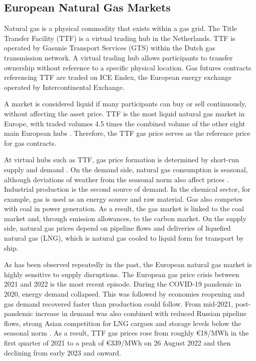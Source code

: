 \subsection{European Natural Gas Markets}\label{sec:gas-markets}
Natural gas is a physical commodity that exists within a gas grid. The Title Transfer Facility (TTF) is a virtual trading hub in the Netherlands. TTF is operated by Gasunie Transport Services (GTS) within the Dutch gas transmission network. A virtual trading hub allows participants to transfer ownership without reference to a specific physical location. Gas futures contracts referencing TTF are traded on ICE Endex, the European energy exchange operated by Intercontinental Exchange.

A market is considered liquid if many participants can buy or sell continuously, without affecting the asset price. TTF is the most liquid natural gas market in Europe, with traded volumes 4.5 times the combined volume of the other eight main European hubs \parencite{heatherEuropeanTradedGas2026}. Therefore, the TTF gas price serves as the reference price for gas contracts. 

At virtual hubs such as TTF, gas price formation is determined by short-run supply and demand \parencite{obadiDRIVINGFUNDAMENTALSNATURAL2020}. On the demand side, natural gas consumption is seasonal, although deviations of weather from the seasonal norm also affect prices \parencite{brownWhatDrivesNatural2008}. Industrial production is the second source of demand. In the chemical sector, for example, gas is used as an energy source and raw material. Gas also competes with coal in power generation. As a result, the gas market is linked to the coal market and, through emission allowances, to the carbon market. On the supply side, natural gas prices depend on pipeline flows and deliveries of liquefied natural gas (LNG), which is natural gas cooled to liquid form for transport by ship. 

As has been observed repeatedly in the past, the European natural gas market is highly sensitive to supply disruptions. The European gas price crisis between 2021 and 2022 is the most recent episode. During the COVID-19 pandemic in 2020, energy demand collapsed. This was followed by economies reopening and gas demand recovered faster than production could follow. From mid-2021, post-pandemic increase in demand was also combined with reduced Russian pipeline flows, strong Asian competition for LNG cargoes and storage levels below the seasonal norm \parencite{heather2022unfortunate}. As a result, TTF gas prices rose from roughly €18/MWh in the first quarter of 2021 to a peak of €339/MWh on 26 August 2022 and then declining from early 2023 and onward. 

